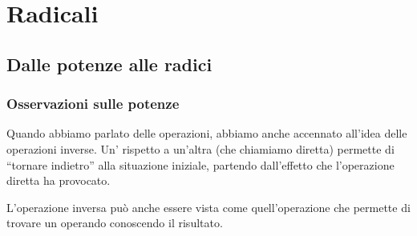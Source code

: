 


\chapter{Radicali}

\section{Dalle potenze alle radici}
\label{sec:radicali_potenze_radici}

\subsection{Osservazioni sulle potenze}


Quando abbiamo parlato delle operazioni, abbiamo anche accennato all'idea
delle operazioni inverse. Un' rispetto a un'altra 
(che chiamiamo diretta) permette di ``tornare indietro'' alla situazione 
iniziale, partendo dall'effetto che l'operazione diretta ha provocato.
% 
% 

L'operazione inversa può anche essere vista come quell'operazione che 
permette di trovare un operando conoscendo il risultato.

% 
% 
% 
% 
% 
% 
% 
% 
% 

